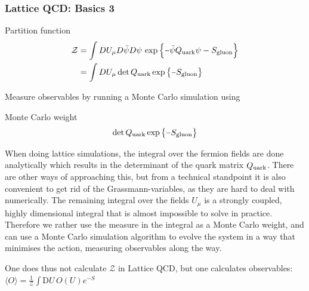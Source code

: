 \documentclass[12pt,a4paper,dvipsnames,usenames]{beamer}
\begin{document}
\begin{frame}
  \frametitle{Lattice QCD: Basics 3}

  \begin{block}{Partition function}
    \begin{align*}
      \mathcal{Z} &= \int D U_{\mu} D \bar{\psi} D \psi \, \exp \Big\{ \minus \bar{\psi} \qmat \psi - S_{\mathrm{gluon}} \Big\} \\
      &= \int D U_{\mu} \det \qmat \exp \big\{ \minus S_{\mathrm{gluon}} \big\}
    \end{align*}
  \end{block}
  
  \vfill
  
  \noindent Measure observables by running a Monte Carlo simulation using

  \vfill

  \begin{block}{Monte Carlo weight}
  \begin{equation*}
    \det \qmat \exp \big\{ \minus S_{\mathrm{gluon}} \big\}
  \end{equation*}
  \end{block}

  \note
  {
    When doing lattice simulations, the integral over the fermion fields are done analytically which results in the determinant of
    the quark matrix $Q_{\mathrm{uark}}$. There are other ways of approaching this, but from a technical standpoint it is also convenient to
    get rid of the Grassmann-variables, as they are hard to deal with numerically. The remaining integral over the fields
    $U_{\mu}$ is a strongly coupled, highly dimensional integral that is almost impossible to solve in practice. Therefore we
    rather use the measure in the integral as a Monte Carlo weight, and can use a Monte Carlo simulation algorithm to evolve the
    system in a way that minimises the action, measuring observables along the way.

    \vspace{1em}

    One does thus not calculate $\mathcal{Z}$ in Lattice QCD, but one calculates observables: 
    $\langle O \rangle = \displaystyle\frac{1}{\mathcal{Z}} \displaystyle\int \mathrm{D} U \, O(U) e^{\minus S}$
  }

\end{frame}
\end{document}
